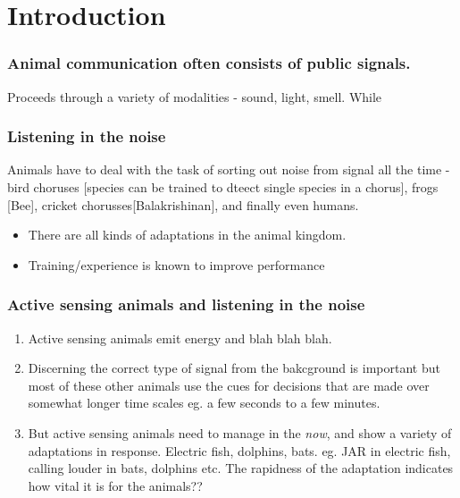 \documentclass[
]{book}
\providecommand{\tightlist}{%
  \setlength{\itemsep}{0pt}\setlength{\parskip}{0pt}}
\begin{document}
\newpage

\hypertarget{introduction}{%
\chapter{Introduction}\label{introduction}}

\hypertarget{animal-communication-often-consists-of-public-signals.}{%
\subsection{Animal communication often consists of public signals.}\label{animal-communication-often-consists-of-public-signals.}}

Proceeds through a variety of modalities - sound, light, smell. While

\hypertarget{listening-in-the-noise}{%
\subsection{Listening in the noise}\label{listening-in-the-noise}}

Animals have to deal with the task of sorting out noise from signal all the time - bird choruses {[}species can be trained to dteect single species in a chorus{]}, frogs {[}Bee{]}, cricket chorusses{[}Balakrishinan{]}, and finally even humans.

\begin{itemize}
\tightlist
\item
  There are all kinds of adaptations in the animal kingdom.
\item
  Training/experience is known to improve performance
\end{itemize}

\hypertarget{active-sensing-animals-and-listening-in-the-noise}{%
\subsection{Active sensing animals and listening in the noise}\label{active-sensing-animals-and-listening-in-the-noise}}

\begin{enumerate}
\def\labelenumi{\arabic{enumi}.}
\item
  Active sensing animals emit energy and blah blah blah.
\item
  Discerning the correct type of signal from the bakcground is important but most of these other animals use the cues for decisions that are made over somewhat longer time scales eg. a few seconds to a few minutes.
\item
  But active sensing animals need to manage in the \emph{now}, and show a variety of adaptations in response. Electric fish, dolphins, bats. eg. JAR in electric fish, calling louder in bats, dolphins etc. The rapidness of the adaptation indicates how vital it is for the animals??
\end{enumerate}
\end{document}
